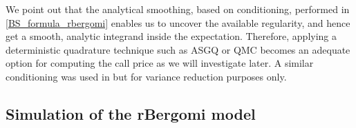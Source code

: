 
We point out that the analytical smoothing, based on conditioning, performed in \eqref{BS_formula_rbergomi} enables us to uncover the available regularity, and hence  get a smooth, analytic integrand inside the expectation. Therefore, applying a deterministic quadrature technique such as ASGQ or QMC becomes an adequate option for computing the call price\red{,} as we will investigate later. A similar conditioning was used in \cite{mccrickerd2018turbocharging} but for variance reduction purposes only.

\subsection{Simulation of the rBergomi model}\label{sec:Simulation of the rBergomi model}

